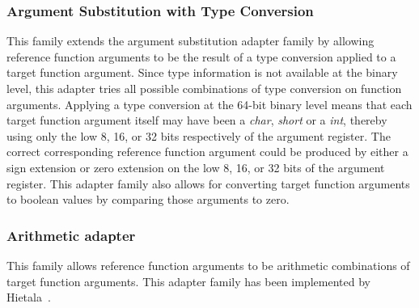 \subsubsection{Argument Substitution with Type Conversion}
This family extends the argument substitution adapter family by allowing
reference function arguments to be the result of a type conversion applied to a target function argument. 
%
Since type information is not available at the binary level, this adapter tries all possible combinations of type conversion on function arguments.
%
Applying a type conversion at the 64-bit binary level means that each
target function argument itself may have been a \textit{char},
\textit{short} or a \textit{int}, thereby using only the low 8, 16, or
32 bits respectively of the argument register.
%
The correct corresponding reference function argument could be produced by either a sign extension or zero extension on the low 8, 16, or 32 bits of the argument register. 
%
This adapter family also allows for converting target function arguments to boolean values by comparing those arguments to zero. 
\subsubsection{Arithmetic adapter}
%
This family allows reference function arguments to be arithmetic combinations of target function arguments.
%
This adapter family has been implemented by Hietala~\cite{kesha-thesis}.
%
%
